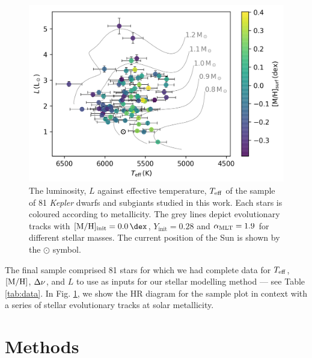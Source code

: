\begin{figure}[tb]
    \centering
    \includegraphics{figures/context.png}
    \caption[The luminosity against effective temperature of the sample of 81 \emph{Kepler} dwarfs and subgiants studied in this work.]{The luminosity, $L$ against effective temperature, ${T_\mathrm{eff}}$ of the sample of 81 \emph{Kepler} dwarfs and subgiants studied in this work. Each stars is coloured according to metallicity. The grey lines depict evolutionary tracks with $\metallicity_\mathrm{init}=\SI{0.0}{\dex}$, $Y_\mathrm{init}=0.28$ and ${\alpha_\mathrm{MLT}}=1.9$ for different stellar masses. The current position of the Sun is shown by the $\odot$ symbol.}
    \label{fig:data}
\end{figure}

The final sample comprised 81 stars for which we had complete data for ${T_\mathrm{eff}}$, $[\mathrm{M}/\mathrm{H}]$, ${\Delta\nu}$, and $L$ to use as inputs for our stellar modelling method --- see Table \ref{tab:data}. In Fig. \ref{fig:data}, we show the HR diagram for the sample plot in context with a series of stellar evolutionary tracks at solar metallicity.

\section{Methods}\label{sec:meth}



